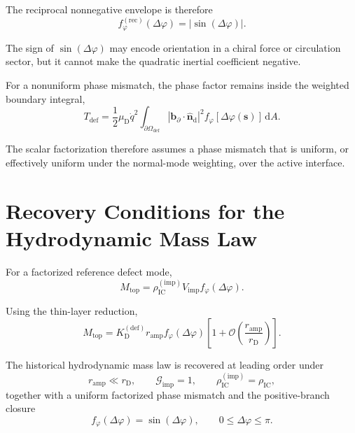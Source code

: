 The reciprocal nonnegative envelope is therefore
\begin{equation}
    f_{\varphi}^{(\mathrm{rec})}(\Delta\varphi)
    =
    |\sin(\Delta\varphi)|.
\end{equation}

The sign of $\sin(\Delta\varphi)$ may encode orientation in a chiral force or circulation sector, but it cannot make the quadratic inertial coefficient negative.

For a nonuniform phase mismatch, the phase factor remains inside the weighted boundary integral,
\begin{equation}
    T_{\mathrm{def}}
    =
    \frac{1}{2}
    \mu_{\mathrm{D}}
    \dot{q}^2
    \int_{\partial\Omega_{\mathrm{def}}}
    |\mathbf{b}_{\partial}\cdot\hat{\mathbf{n}}_{\mathrm{d}}|^2
    f_{\varphi}
    [\Delta\varphi(\boldsymbol{s})]
    \,
    \mathrm{d}A.
\end{equation}

The scalar factorization therefore assumes a phase mismatch that is uniform, or effectively uniform under the normal-mode weighting, over the active interface.


\section{Recovery Conditions for the Hydrodynamic Mass Law}
\label{sec:AP_recovery_mass_law}

For a factorized reference defect mode,
\begin{equation}
    M_{\mathrm{top}}
    =
    \rho_{\mathrm{IC}}^{(\mathrm{imp})}
    V_{\mathrm{imp}}
    f_{\varphi}(\Delta\varphi).
\end{equation}

Using the thin-layer reduction,
\begin{equation}
    M_{\mathrm{top}}
    =
    K_{\mathrm{D}}^{(\mathrm{def})}
    r_{\mathrm{amp}}
    f_{\varphi}(\Delta\varphi)
    \left[
        1
        +
        \mathcal{O}
        \left(
            \frac{r_{\mathrm{amp}}}{r_{\mathrm{D}}}
        \right)
    \right].
\end{equation}

The historical hydrodynamic mass law is recovered at leading order under
\begin{equation}
    r_{\mathrm{amp}}
    \ll
    r_{\mathrm{D}},
    \qquad
    \mathcal{G}_{\mathrm{imp}}
    =
    1,
    \qquad
    \rho_{\mathrm{IC}}^{(\mathrm{imp})}
    =
    \rho_{\mathrm{IC}},
\end{equation}
together with a uniform factorized phase mismatch and the positive-branch closure
\begin{equation}
    f_{\varphi}(\Delta\varphi)
    =
    \sin(\Delta\varphi),
    \qquad
    0
    \leq
    \Delta\varphi
    \leq
    \pi.
\end{equation}

